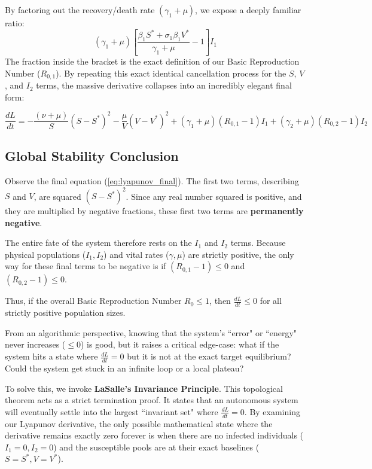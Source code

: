 \documentclass[12pt]{article}
\begin{document}
By factoring out the recovery/death rate $(\gamma_1 + \mu)$, we expose a deeply familiar ratio:
\begin{equation*}
(\gamma_1 + \mu) \left[ \frac{\beta_1 S^* + \sigma_1 \beta_1 V^*}{\gamma_1 + \mu} - 1 \right] I_1
\end{equation*}
The fraction inside the bracket is the exact definition of our Basic Reproduction Number ($R_{0,1}$). By repeating this exact identical cancellation process for the $S$, $V$, and $I_2$ terms, the massive derivative collapses into an incredibly elegant final form:

\begin{equation} \label{eq:lyapunov_final}
\frac{dL}{dt} = -\frac{(\nu + \mu)}{S}(S - S^*)^2 - \frac{\mu}{V}(V - V^*)^2 + (\gamma_1 + \mu)(R_{0,1} - 1)I_1 + (\gamma_2 + \mu)(R_{0,2} - 1)I_2
\end{equation}

\subsection{Global Stability Conclusion}
Observe the final equation (\ref{eq:lyapunov_final}). The first two terms, describing $S$ and $V$, are squared $(S - S^*)^2$. Since any real number squared is positive, and they are multiplied by negative fractions, these first two terms are \textbf{permanently negative}. 

The entire fate of the system therefore rests on the $I_1$ and $I_2$ terms. Because physical populations ($I_1, I_2$) and vital rates ($\gamma, \mu$) are strictly positive, the only way for these final terms to be negative is if $(R_{0,1} - 1) \le 0$ and $(R_{0,2} - 1) \le 0$. 

Thus, if the overall Basic Reproduction Number $R_0 \le 1$, then $\frac{dL}{dt} \le 0$ for all strictly positive population sizes.

From an algorithmic perspective, knowing that the system's ``error" or ``energy" never increases ($\le 0$) is good, but it raises a critical edge-case: what if the system hits a state where $\frac{dL}{dt} = 0$ but it is not at the exact target equilibrium? Could the system get stuck in an infinite loop or a local plateau? 

To solve this, we invoke \textbf{LaSalle's Invariance Principle}. This topological theorem acts as a strict termination proof. It states that an autonomous system will eventually settle into the largest ``invariant set" where $\frac{dL}{dt} = 0$. By examining our Lyapunov derivative, the only possible mathematical state where the derivative remains exactly zero forever is when there are no infected individuals ($I_1 = 0, I_2 = 0$) and the susceptible pools are at their exact baselines ($S = S^*, V = V^*$).
\end{document}
